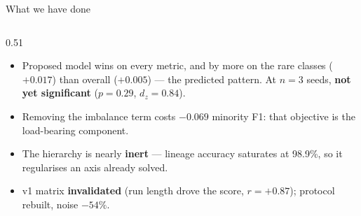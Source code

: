 \documentclass[aspectratio=169,11pt]{beamer}
\newcommand{\good}[1]{\textcolor{green!45!black}{\textbf{#1}}}
\newcommand{\bad}[1]{\textcolor{red!70!black}{\textbf{#1}}}
\begin{document}
\begin{frame}{What we have done}
\begin{columns}[T]
\begin{column}{0.51\textwidth}
      \smallskip
      \begin{itemize}\setlength{\itemsep}{0.15em}
        \item Proposed model wins on every metric, and by more on the rare
          classes ($+0.017$) than overall ($+0.005$) --- the predicted pattern.
          At $n=3$ seeds, \bad{not yet significant} ($p = 0.29$, $d_z = 0.84$).
        \item Removing the imbalance term costs \bad{$-0.069$} minority F1: that
          objective is the load-bearing component.
        \item The hierarchy is nearly \textbf{inert} --- lineage accuracy
          saturates at 98.9\%, so it regularises an axis already solved.
        \item v1 matrix \bad{invalidated} (run length drove the score,
          $r = +0.87$); protocol rebuilt, noise \good{$-54\%$}.
      \end{itemize}
    \end{column}
  \end{columns}
\end{frame}
\end{document}
